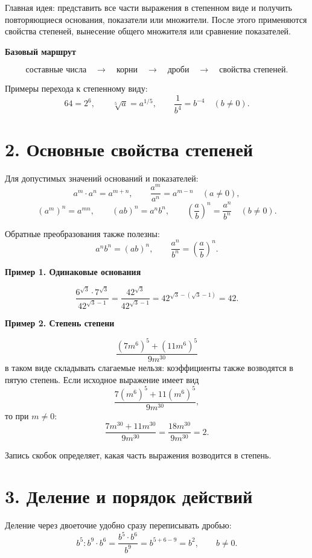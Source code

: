 \documentclass[a4paper,12pt]{article}
\newcommand{\sectionline}{%
    \par\noindent{\color{accent}\rule{\linewidth}{0.7pt}}\par
}
\newcommand{\important}[1]{%
    \par\smallskip
    {\color{darkaccent}\bfseries #1}
    \par\smallskip
}
\begin{document}
Главная идея: представить все части выражения в степенном виде и получить
повторяющиеся основания, показатели или множители. После этого применяются
свойства степеней, вынесение общего множителя или сравнение показателей.

\important{Базовый маршрут}

\[
\boxed{\text{составные числа}}
\quad\longrightarrow\quad
\boxed{\text{корни}}
\quad\longrightarrow\quad
\boxed{\text{дроби}}
\quad\longrightarrow\quad
\boxed{\text{свойства степеней}}.
\]

Примеры перехода к степенному виду:
\[
64=2^6,\qquad
\sqrt[5]{a}=a^{1/5},\qquad
\frac{1}{b^4}=b^{-4}\quad (b\ne0).
\]

\section*{\color{darkaccent}2. Основные свойства степеней}
\sectionline

Для допустимых значений оснований и показателей:
\[
a^m\cdot a^n=a^{m+n},
\qquad
\frac{a^m}{a^n}=a^{m-n}\quad (a\ne0),
\]
\[
(a^m)^n=a^{mn},
\qquad
(ab)^n=a^n b^n,
\qquad
\left(\frac{a}{b}\right)^n=\frac{a^n}{b^n}\quad (b\ne0).
\]

Обратные преобразования также полезны:
\[
a^n b^n=(ab)^n,
\qquad
\frac{a^n}{b^n}=\left(\frac{a}{b}\right)^n.
\]

\important{Пример 1. Одинаковые основания}

\[
\frac{6^{\sqrt3}\cdot 7^{\sqrt3}}
     {42^{\sqrt3-1}}
=
\frac{42^{\sqrt3}}{42^{\sqrt3-1}}
=
42^{\sqrt3-(\sqrt3-1)}
=42.
\]

\important{Пример 2. Степень степени}

\[
\frac{(7m^6)^5+(11m^6)^5}
     {9m^{30}}
\]
в таком виде складывать слагаемые нельзя: коэффициенты также возводятся
в пятую степень. Если исходное выражение имеет вид
\[
\frac{7(m^6)^5+11(m^6)^5}{9m^{30}},
\]
то при \(m\ne0\):
\[
\frac{7m^{30}+11m^{30}}{9m^{30}}
=
\frac{18m^{30}}{9m^{30}}
=2.
\]

Запись скобок определяет, какая часть выражения возводится в степень.

\section*{\color{darkaccent}3. Деление и порядок действий}
\sectionline

Деление через двоеточие удобно сразу переписывать дробью:
\[
b^5:b^9\cdot b^6
=
\frac{b^5\cdot b^6}{b^9}
=
b^{5+6-9}
=
b^2,\qquad b\ne0.
\]
\end{document}
